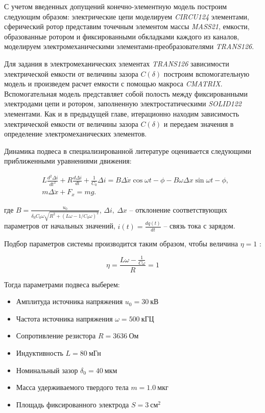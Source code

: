 С учетом введенных допущений конечно-элементную модель построим следующим образом: электрические цепи моделируем \textit{CIRCU124} элементами, сферический ротор представим точечным элементом массы \textit{MASS21}, емкости, образованные ротором и фиксированными обкладками каждого из каналов, моделируем электромеханическими элементами-преобразователями \textit{TRANS126}.

Для задания в электромеханических элементах \textit{TRANS126} зависимости электрической емкости от величины зазора $C(\delta)$ построим вспомогательную модель и произведем расчет емкости с помощью макроса \textit{CMATRIX}. Вспомогательная модель представляет собой полость между фиксированными электродами цепи и ротором, заполненную электростатическими \textit{SOLID122} элементами. Как и в предыдущей главе, итерационно находим зависимость электрической емкости от величины зазора $C(\delta)$ и передаем значения в определение электромеханических элементов.

Динамика подвеса в специализированной литературе \cite{Electropribor} оценивается следующими приближенными уравнениями движения:

\begin{equation}
  \label{eq:sphere_susp_motion}
    \begin{alignedat}{2}
    &L \frac{d^2 \Delta i}{dt^2} + R \frac{d \Delta i}{dt} + \frac{1}{C_0} \Delta i = B \Delta \dot x \cos{\omega t - \phi} - B \omega \Delta x \sin{\omega t - \phi}, \\
    &m \Delta \ddot x + F_x = mg.
    \end{alignedat}
\end{equation}


\noindent где $B = \frac{u_0}{ \delta_0 C_0 \omega \sqrt{R^2 + (L \omega -1/C_0 \omega)^2} }$, $\Delta i,\ \Delta x$ – отклонение соответствующих параметров от начальных значений, $i(t) = \frac{dq(t)}{dt}$ – связь тока с зарядом. 

Подбор параметров системы производится таким образом, чтобы величина $\eta = 1$ \cite{Electropribor}:

\[
\eta = \frac{L\omega - \frac{1}{C\omega}}{R} = 1
\]

Тогда параметрами подвеса выберем:
\begin{itemize}
  \item Амплитуда источника напряжения $u_0 = 30\ \text{кВ}$
  \item Частота источника напряжения $\omega = 500\ \text{кГЦ}$
  \item Сопротивление резистора $R = 3636\ \text{Ом}$
  \item Индуктивность $L = 80\ \text{мГн}$
  \item Номинальный зазор $\delta_0 = 40\ \text{мкм}$
  \item Масса удерживаемого твердого тела $m = 1.0\ \text{мкг}$
  \item Площадь фиксированного электрода $S = 3\ \text{см}^2$
\end{itemize}



